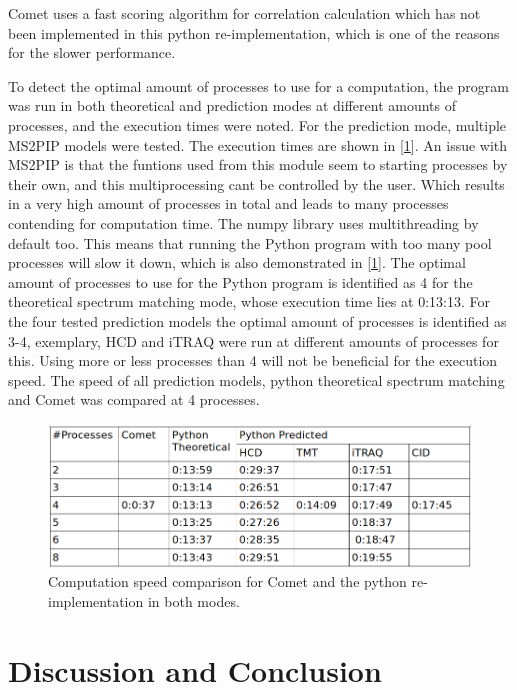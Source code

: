 \documentclass[11pt]{article}
\begin{document}
Comet uses a fast scoring algorithm for correlation calculation which has not been implemented in this python re-implementation, which is one of the reasons for the slower performance.

To detect the optimal amount of processes to use for a computation, the program was run in both theoretical and prediction modes at different amounts of processes, and the execution times were noted. For the prediction mode, multiple MS2PIP models were tested. The execution times are shown in [\cref{fig:speed-comparison}]. An issue with MS2PIP is that the funtions used from this module seem to starting processes by their own, and this multiprocessing cant be controlled by the user. Which results in a very high amount of processes in total and leads to many processes contending for computation time. The numpy library uses multithreading by default too. This means that running the Python program with too many pool processes will slow it down, which is also demonstrated in [\cref{fig:speed-comparison}]. The optimal amount of processes to use for the Python program is identified as 4 for the theoretical spectrum matching mode, whose execution time lies at 0:13:13. For the four tested prediction models the optimal amount of processes is identified as 3-4, exemplary, HCD and iTRAQ were run at different amounts of processes for this. Using more or less processes than 4 will not be beneficial for the execution speed. The speed of all prediction models, python theoretical spectrum matching and Comet was compared at 4 processes.

\begin{figure}
\centering
\includegraphics[width=1\textwidth]{figs/speed-comparison.png}
\caption{Computation speed comparison for Comet and the python re-implementation in both modes.}
\label{fig:speed-comparison}
\end{figure}

\newpage

\section{Discussion and Conclusion}
\end{document}

